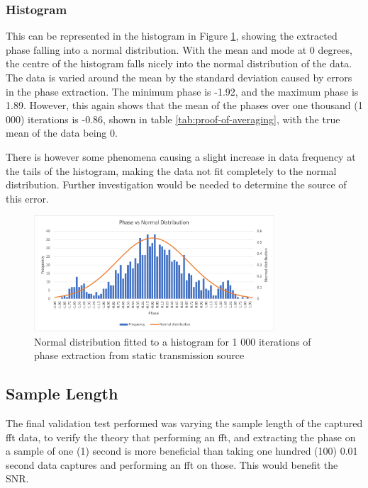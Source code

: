 \documentclass[class=report,11pt,crop=false]{standalone}
\begin{document}
\subsubsection{Histogram}
This can be represented in the histogram in Figure \ref{fig:hist}, showing the extracted phase falling into a normal distribution. With the mean and mode at 0 degrees, the centre of the histogram falls nicely into the normal distribution of the data. The data is varied around the mean by the standard deviation caused by errors in the phase extraction. The minimum phase is -1.92, and the maximum phase is 1.89. However, this again shows that the mean of the phases over one thousand (1 000) iterations is -0.86, shown in table \ref{tab:proof-of-averaging}, with the true mean of the data being 0.  

There is however some phenomena causing a slight increase in data frequency at the tails of the histogram, making the data not fit completely to the normal distribution. Further investigation would be needed to determine the source of this error. 

\begin{figure}[h]
    \centering
    \includegraphics[width=0.8\textwidth]{Images/plots/phaseandnormal.png}
    \caption{Normal distribution fitted to a histogram for 1 000 iterations of phase extraction from static transmission source}
    \label{fig:hist}
\end{figure}


\subsection{Sample Length}
The final validation test performed was varying the sample length of the captured \gls{fft} data, to verify the theory that performing an \gls{fft}, and extracting the phase on a sample of one (1) second is more beneficial than taking one hundred (100) 0.01 second data captures and performing an \gls{fft} on those. This would benefit the \gls{SNR}. 
\end{document}
